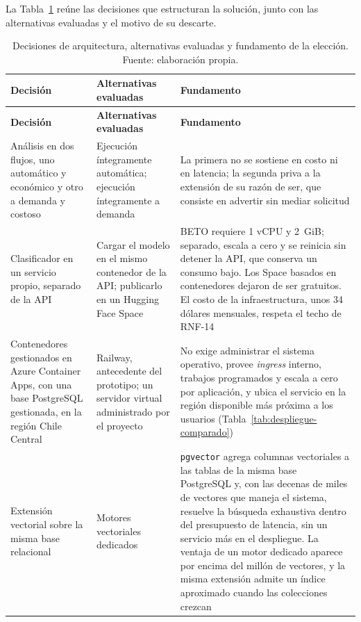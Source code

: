 La Tabla~\ref{tab:decisiones-arq} reúne las decisiones que estructuran la solución, junto con las alternativas evaluadas y el motivo de su descarte.

\begin{small}
\begin{longtable}{@{}p{4cm} p{4.2cm} p{6cm}@{}}
  \caption{Decisiones de arquitectura, alternativas evaluadas y fundamento de la elección. Fuente: elaboración propia.}
  \label{tab:decisiones-arq} \\
  \hline
  \textbf{Decisión} & \textbf{Alternativas evaluadas} & \textbf{Fundamento} \\
  \hline
  \endfirsthead
  \hline
  \textbf{Decisión} & \textbf{Alternativas evaluadas} & \textbf{Fundamento} \\
  \hline
  \endhead
  \hline
  \endfoot
  Análisis en dos flujos, uno automático y económico y otro a demanda y costoso & Ejecución íntegramente automática; ejecución íntegramente a demanda & La primera no se sostiene en costo ni en latencia; la segunda priva a la extensión de su razón de ser, que consiste en advertir sin mediar solicitud \\
  Clasificador en un servicio propio, separado de la API & Cargar el modelo en el mismo contenedor de la API; publicarlo en un Hugging Face Space & BETO requiere 1 vCPU y 2~GiB; separado, escala a cero y se reinicia sin detener la API, que conserva un consumo bajo. Los Space basados en contenedores dejaron de ser gratuitos. El costo de la infraestructura, unos 34 dólares mensuales, respeta el techo de RNF-14 \\
  Contenedores gestionados en Azure Container Apps, con una base PostgreSQL gestionada, en la región Chile Central & Railway, antecedente del prototipo; un servidor virtual administrado por el proyecto & No exige administrar el sistema operativo, provee \textit{ingress} interno, trabajos programados y escala a cero por aplicación, y ubica el servicio en la región disponible más próxima a los usuarios (Tabla~\ref{tab:despliegue-comparado}) \\
  Extensión vectorial sobre la misma base relacional & Motores vectoriales dedicados & \texttt{pgvector} agrega columnas vectoriales a las tablas de la misma base PostgreSQL y, con las decenas de miles de vectores que maneja el sistema, resuelve la búsqueda exhaustiva dentro del presupuesto de latencia, sin un servicio más en el despliegue. La ventaja de un motor dedicado aparece por encima del millón de vectores, y la misma extensión admite un índice aproximado cuando las colecciones crezcan \\

\end{longtable}
\end{small}
